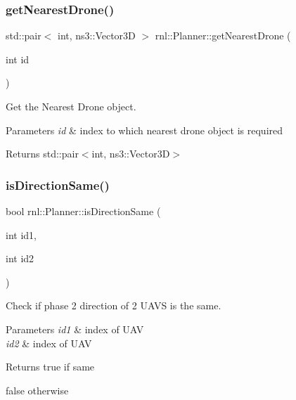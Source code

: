 \subsubsection{\texorpdfstring{get\+Nearest\+Drone()}{getNearestDrone()}}
{\footnotesize\ttfamily std\+::pair$<$ int, ns3\+::\+Vector3D $>$ rnl\+::\+Planner\+::get\+Nearest\+Drone (\begin{DoxyParamCaption}\item[{int}]{id }\end{DoxyParamCaption})}



Get the Nearest Drone object. 


\begin{DoxyParams}{Parameters}
{\em id} & index to which nearest drone object is required \\
\hline
\end{DoxyParams}
\begin{DoxyReturn}{Returns}
std\+::pair$<$int, ns3\+::\+Vector3\+D$>$ 
\end{DoxyReturn}
\mbox{\label{classrnl_1_1Planner_a2120744f60206f71e1b773d8d9350338}} 
\subsubsection{\texorpdfstring{is\+Direction\+Same()}{isDirectionSame()}}
{\footnotesize\ttfamily bool rnl\+::\+Planner\+::is\+Direction\+Same (\begin{DoxyParamCaption}\item[{int}]{id1,  }\item[{int}]{id2 }\end{DoxyParamCaption})}



Check if phase 2 direction of 2 U\+A\+VS is the same. 


\begin{DoxyParams}{Parameters}
{\em id1} & index of U\+AV \\
\hline
{\em id2} & index of U\+AV \\
\hline
\end{DoxyParams}
\begin{DoxyReturn}{Returns}
true if same 

false otherwise 
\end{DoxyReturn}
\mbox{\label{classrnl_1_1Planner_a71cf439e458cf58689e2411a4d0cb62e}} 
